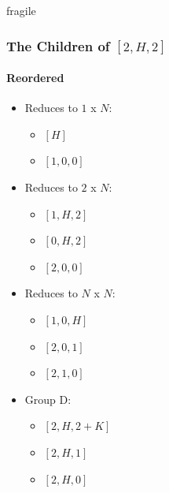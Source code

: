 \documentclass[aspectratio=169,usenames,dvipsnames]{beamer}
\begin{document}
\begin{frame}{fragile}
    \frametitle{The Children of $[2, H, 2]$}
    \framesubtitle{Reordered}
    
    \begin{multicols}{2}
    \begin{itemize}
        \item Reduces to $1$ x $N$:
        \begin{itemize}
            \item $[H]$
            \item $[1, 0, 0]$
        \end{itemize}
    \end{itemize}
    \text{$  $} %
    
    \begin{itemize}
        \item Reduces to $2$ x $N$:
        \begin{itemize}
            \item $[1, H, 2]$
            \item $[0, H, 2]$
            \item $[2, 0, 0]$
        \end{itemize}
    \end{itemize}
    
    \begin{itemize}
        \item Reduces to $N$ x $N$:
        \begin{itemize}
            \item $[1, 0, H]$
            \item $[2, 0, 1]$
            \item $[2, 1, 0]$
        \end{itemize}
    \end{itemize}
    
    \begin{itemize}
        \item Group D:
        \begin{itemize}
            \item $[2, H, 2 + K]$
            \item $[2, H, 1]$
            \item $[2, H, 0]$
        \end{itemize}
    \end{itemize}
    \end{multicols}
    
\end{frame}
\end{document}
